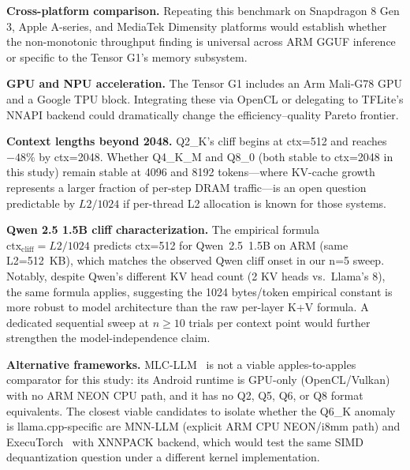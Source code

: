 \documentclass[conference]{IEEEtran}
\begin{document}
\textbf{Cross-platform comparison.} Repeating this benchmark on Snapdragon 8 Gen 3,
Apple A-series, and MediaTek Dimensity platforms would establish whether the
non-monotonic throughput finding is universal across ARM GGUF inference or
specific to the Tensor G1's memory subsystem.

\textbf{GPU and NPU acceleration.} The Tensor G1 includes an Arm Mali-G78 GPU
and a Google TPU block. Integrating these via OpenCL or delegating to TFLite's
NNAPI backend could dramatically change the efficiency--quality Pareto frontier.

\textbf{Context lengths beyond 2048.}
Q2\_K's cliff begins at ctx=512 and reaches $-48\%$ by ctx=2048.
Whether Q4\_K\_M and Q8\_0 (both stable to ctx=2048 in this study) remain
stable at 4096 and 8192 tokens---where KV-cache growth represents a larger
fraction of per-step DRAM traffic---is an open question predictable by
$L2/1024$ if per-thread L2 allocation is known for those systems.

\textbf{Qwen 2.5 1.5B cliff characterization.}
The empirical formula $\text{ctx}_{\text{cliff}} = L2/1024$ predicts ctx=512 for Qwen~2.5~1.5B
on ARM (same L2=512~KB), which matches the observed Qwen cliff onset in our n=5 sweep.
Notably, despite Qwen's different KV head count (2 KV heads vs.\ Llama's 8), the
same formula applies, suggesting the 1024 bytes/token empirical constant is more
robust to model architecture than the raw per-layer K+V formula.
A dedicated sequential sweep at $n{\geq}10$ trials per context point would
further strengthen the model-independence claim.

\textbf{Alternative frameworks.}
MLC-LLM~\cite{mlcllm} is not a viable apples-to-apples comparator for this study:
its Android runtime is GPU-only (OpenCL/Vulkan) with no ARM NEON CPU path,
and it has no Q2, Q5, Q6, or Q8 format equivalents.
The closest viable candidates to isolate whether the Q6\_K anomaly is
llama.cpp-specific are MNN-LLM (explicit ARM CPU NEON/i8mm path)
and ExecuTorch~\cite{executorch} with XNNPACK backend, which would test the
same SIMD dequantization question under a different kernel implementation.
\end{document}
